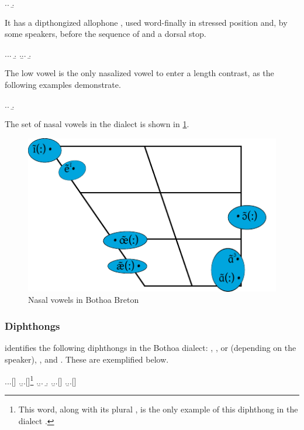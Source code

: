 \ex.\a.
\b.

It has a dipthongized allophone , used word-finally in stressed position and, by some speakers, before the sequence of  and a dorsal stop.

\ex.\a.\a.
\b.
\z.\b.\a.
\b.

The low vowel is the only nasalized vowel to enter a length contrast, as the following examples demonstrate.

\ex.\a.
\b.

The set of nasal vowels in the dialect is shown in \cref{fig:bothoa-nasal-vowels}.

\begin{figure}[htp]
  \centering
  \includegraphics[width=.8\textwidth]{graphics/vowelcharts/bothoa-nasal-vowels}
  \caption{Nasal vowels in Bothoa Breton}
  \label{fig:bothoa-nasal-vowels}
\end{figure}

\subsubsection{Diphthongs}
\label{sec:diphthongs}

\citet{humphreys95:_phonol_bothoa_saint_nicol_pelem} identifies the following diphthongs in the Bothoa dialect: , ,  or  (depending on the speaker), , and . These are exemplified below.

\ex.\a.\a.[]
\z.\b.\a.[]\footnote{This word, along with its plural , is the only example of this diphthong in the dialect    \citep[p.~120]{humphreys95:_phonol_bothoa_saint_nicol_pelem}.}
\z.\b.\a.
\b.
\z.\b.\a.[]
\z.\b.\a.[]


